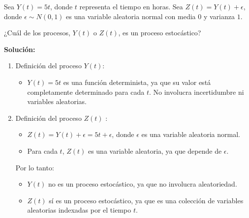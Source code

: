 \documentclass[
  us-letterpaper,
]{scrreprt}
\providecommand{\tightlist}{%
  \setlength{\itemsep}{0pt}\setlength{\parskip}{0pt}}\usepackage{longtable,booktabs,array}
\theoremstyle{plain}
\theoremstyle{plain}
\theoremstyle{definition}
\theoremstyle{remark}
\begin{document}
\begin{tcolorbox}[enhanced jigsaw, titlerule=0mm, opacityback=0, coltitle=black, bottomrule=.15mm, colbacktitle=quarto-callout-caution-color!10!white, toprule=.15mm, colback=white, arc=.35mm, colframe=quarto-callout-caution-color-frame, leftrule=.75mm, bottomtitle=1mm, left=2mm, toptitle=1mm, opacitybacktitle=0.6, breakable, title={Ejemplo (\textbf{\emph{Procesos Estocásticos}})}, rightrule=.15mm]

Sea \(Y(t) = 5t\), donde \(t\) representa el tiempo en horas. Sea
\(Z(t) = Y(t) + \epsilon\), donde \(\epsilon \sim N(0, 1)\) es una
variable aleatoria normal con media \(0\) y varianza \(1\).

¿Cuál de los procesos, \(Y(t)\) o \(Z(t)\), es un proceso estocástico?

\textbf{Solución:}

\begin{enumerate}
\def\labelenumi{\arabic{enumi}.}
\item
  Definición del proceso \(Y(t)\):

  \begin{itemize}
  \tightlist
  \item
    \(Y(t) = 5t\) es una función determinista, ya que su valor está
    completamente determinado para cada \(t\). No involucra
    incertidumbre ni variables aleatorias.
  \end{itemize}
\item
  Definición del proceso \(Z(t)\) :

  \begin{itemize}
  \item
    \(Z(t) = Y(t) + \epsilon = 5t + \epsilon\), donde \(\epsilon\) es
    una variable aleatoria normal.
  \item
    Para cada \(t\), \(Z(t)\) es una variable aleatoria, ya que depende
    de \(\epsilon\).
  \end{itemize}

  Por lo tanto:

  \begin{itemize}
  \item
    \(Y(t)\) no es un proceso estocástico, ya que no involucra
    aleatoriedad.
  \item
    \(Z(t)\) sí es un proceso estocástico, ya que es una colección de
    variables aleatorias indexadas por el tiempo \(t\).
  \end{itemize}
\end{enumerate}

\end{tcolorbox}
\end{document}
